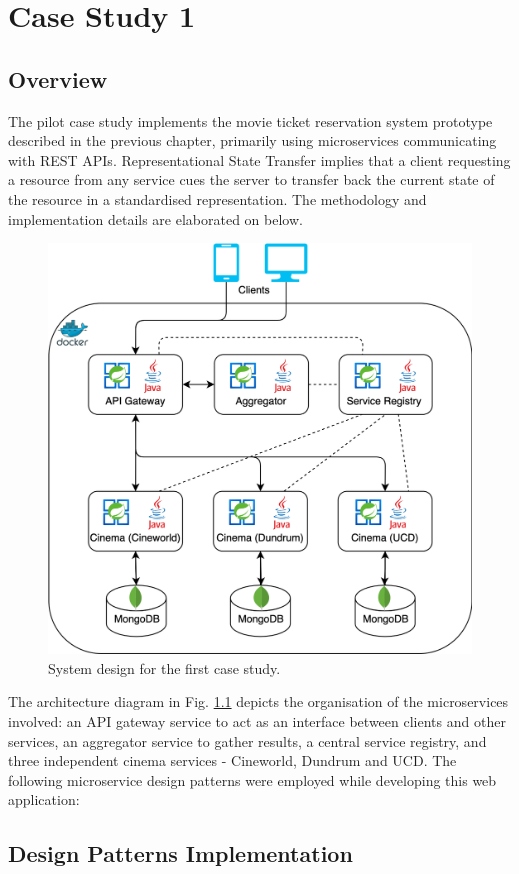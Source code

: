 \chapter{Case Study 1}

\section{Overview}

The pilot case study implements the movie ticket reservation system prototype described in the previous chapter, primarily using microservices communicating with REST APIs. Representational State Transfer implies that a client requesting a resource from any service cues the server to transfer back the current state of the resource in a standardised representation. The methodology and implementation details are elaborated on below.

\begin{figure}[H]
  \centering
  \includegraphics[width=0.6\linewidth]{./assets/diagrams/cs01-arch.png}
  \caption{System design for the first case study.}
  \label{fig:cs01-arch}
\end{figure}

The architecture diagram in Fig. \ref{fig:cs01-arch} depicts the organisation of the microservices involved: an API gateway service to act as an interface between clients and other services, an aggregator service to gather results, a central service registry, and three independent cinema services - Cineworld, Dundrum and UCD. The following microservice design patterns were employed while developing this web application:

\section{Design Patterns Implementation}

